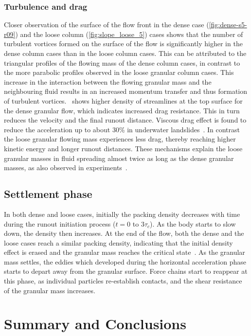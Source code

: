 \documentclass[12pt,twoside]{tuhhproc-en}
\begin{document}
\subsubsection{Turbulence and drag}
Closer observation of the surface of the flow front in the dense case (\cref{fig:dense-s5-r09}) and the loose column (\cref{fig:slope_loose_5}) cases shows that the number of turbulent vortices formed on the surface of the flow is significantly higher in the dense column cases than in the loose column cases. This can be attributed to the triangular profiles of the flowing mass of the dense column cases, in contrast to the more parabolic profiles observed in the loose granular column cases. This increase in the interaction between the flowing granular mass and the neighbouring fluid results in an increased momentum transfer and thus formation of turbulent vortices.~ shows higher density of streamlines at the top surface for the dense granular flow, which indicates increased drag resistance. This in turn reduces the velocity and the final runout distance. Viscous drag effect is found to reduce the acceleration up to about 30\% in underwater landslides~\citep{Watts2000}. In contrast the loose granular flowing mass experiences less drag, thereby reaching higher kinetic energy and longer runout distances. These mechanisms explain the loose granular masses in fluid spreading almost twice as long as the dense granular masses, as also observed in experiments~\citep{Iverson2000, Schaeffer2008}. 

\subsection{Settlement phase}
In both dense and loose cases, initially the packing density decreases with time during the runout initiation process ($t = 0$ to $3\tau_c$). As the body starts to slow down, the density then increases. At the end of the flow, both the dense and the loose cases reach a similar packing density, indicating that the initial density effect is erased and the granular mass reaches the critical state~\citep{Schofield1968}. As the granular mass settles, the eddies which developed during the horizontal acceleration phase starts to depart away from the granular surface. Force chains start to reappear at this phase, as individual particles re-establish contacts, and the shear resistance of the granular mass increases.


\section{Summary and Conclusions}
\end{document}
